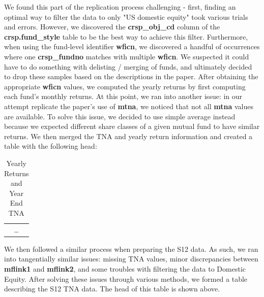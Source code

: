 \documentclass{article}
\begin{document}
We found this part of the replication process challenging - first, finding an optimal way to filter the data
to only "US domestic equity" took various trials and errors. However, we discovered the \textbf{crsp\_obj\_cd} column 
of the \textbf{crsp.fund\_style} table to be the best way to achieve this filter. Furthermore,
when using the fund-level identifier \textbf{wficn}, we discovered a handful of occurrences where 
one \textbf{crsp\_fundno} matches with multiple \textbf{wficn}. We suspected it could have to do 
something with delisting / merging of funds, and ultimately decided to drop these samples 
based on the descriptions in the paper. After obtaining the appropriate \textbf{wficn} values,
we computed the yearly returns by first computing each fund's
monthly returns. At this point, we 
ran into another issue: in our attempt replicate the paper's use of \textbf{mtna}, we noticed that
not all \textbf{mtna} values are available. To solve this issue, we decided to use simple
average instead because we expected different share classes of a given mutual fund to have similar
returns. We then merged the TNA and yearly return information and created a table with the following
head:  

\begin{table}[ht]

\centering
\captionsetup{labelformat=empty, font=bf}
\caption{Yearly Returns and Year End TNA}
\label{tab:table_crsp_clean}

\vspace{5pt} %

\begin{tabular}{c} %

\multicolumn{1}{c}{\ldots} \\ %
\end{tabular}
\end{table}


We then followed a similar process when preparing the S12 data. As such, we ran into
tangentially similar issues: missing TNA values, minor discrepancies between
\textbf{mflink1} and \textbf{mflink2}, and some troubles with filtering the data 
to Domestic Equity. After solving these issues through various methods, we formed a
table describing the S12 TNA data. The head of this table is shown above. 
\end{document}

